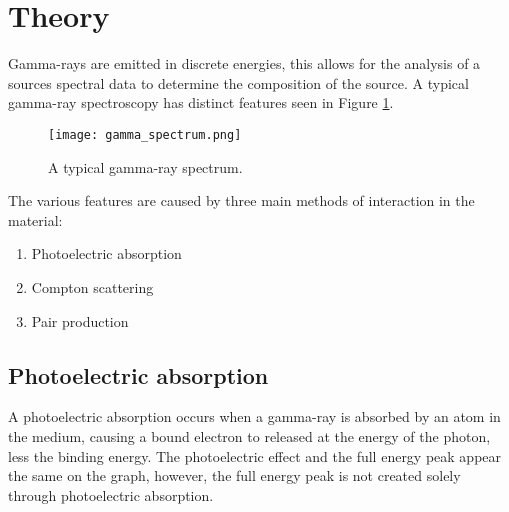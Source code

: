 \documentclass[..Spectroscopy.tex]{subfiles}
\begin{document}
\section{Theory}
	Gamma-rays are emitted in discrete energies, this allows for the analysis of a sources spectral data to determine the composition of the source. A typical gamma-ray spectroscopy has distinct features seen in Figure \ref{fig:gamma_spectrum}. 
	\begin{figure}[h!]
		\centering
		\texttt{[image: gamma\_spectrum.png]}
		\caption{A typical gamma-ray spectrum.\cite{mcgregor}}
		\label{fig:gamma_spectrum}
	\end{figure}
The various features are caused by three main methods of interaction in the material:
	\begin{enumerate}
		\item Photoelectric absorption
		\item Compton scattering
		\item Pair production
	\end{enumerate}
\noindent
\subsection{Photoelectric absorption}
	A photoelectric absorption occurs when a gamma-ray is absorbed by an atom in the medium, causing a bound electron to released at the energy of the photon, less the binding energy. The photoelectric effect and the full energy peak appear the same on the graph, however, the full energy peak is not created solely through photoelectric absorption. \cite{photo_effect}
\end{document}
